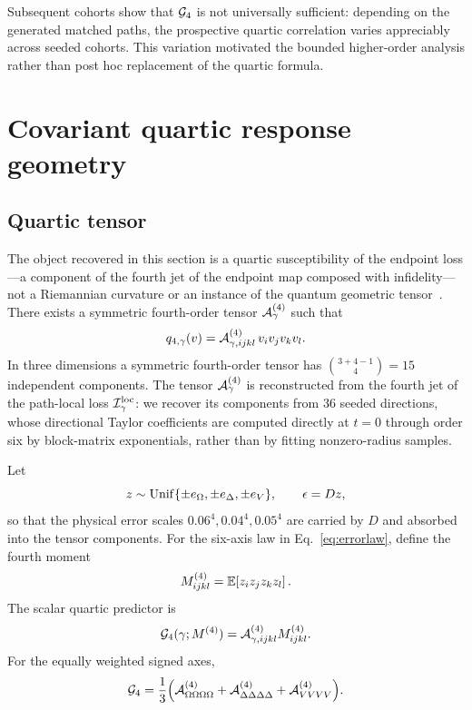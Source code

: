 Subsequent cohorts show that $\mathcal{G}_{4}$ is not universally sufficient: depending on the
generated matched paths, the prospective quartic correlation varies appreciably across
seeded cohorts. This variation motivated the bounded higher-order analysis rather than post
hoc replacement of the quartic formula.

\section{Covariant quartic response geometry}\label{sec:covariant}

\subsection{Quartic tensor}

The object recovered in this section is a quartic susceptibility of the endpoint loss---a
component of the fourth jet of the endpoint map composed with infidelity---not a
Riemannian curvature or an instance of the quantum geometric tensor~\cite{provost1980}.
There exists a symmetric fourth-order tensor $\mathcal{A}^{(4)}_{\gamma}$ such that
\begin{equation}\label{eq:quartictensor}
q_{4,\gamma}(v)=\mathcal{A}^{(4)}_{\gamma,ijkl}\,v_{i}v_{j}v_{k}v_{l}.
\end{equation}
In three dimensions a symmetric fourth-order tensor has $\binom{3+4-1}{4}=15$ independent
components. The tensor $\mathcal{A}^{(4)}_{\gamma}$ is reconstructed from the fourth jet of the
path-local loss $\mathcal{I}^{\mathrm{loc}}_{\gamma}$: we recover its components from 36 seeded directions,
whose directional Taylor coefficients are computed directly at $t=0$ through order six by
block-matrix exponentials, rather than by fitting nonzero-radius samples.

Let
\[
z\sim\mathrm{Unif}\{\pm e_{\Omega},\pm e_{\Delta},\pm e_{V}\},\qquad \epsilon=Dz,
\]
so that the physical error scales $0.06^{4},0.04^{4},0.05^{4}$ are carried by $D$ and
absorbed into the tensor components. For the six-axis law in Eq.~\eqref{eq:errorlaw},
define the fourth moment
\[
M^{(4)}_{ijkl}=\mathbb{E}\!\left[z_{i}z_{j}z_{k}z_{l}\right].
\]
The scalar quartic predictor is
\begin{equation}\label{eq:g4}
\mathcal{G}_{4}(\gamma;M^{(4)})=\mathcal{A}^{(4)}_{\gamma,ijkl}M^{(4)}_{ijkl}.
\end{equation}
For the equally weighted signed axes,
\[
\mathcal{G}_{4}=\frac{1}{3}\Bigl(\mathcal{A}^{(4)}_{\Omega\Omega\Omega\Omega}
+\mathcal{A}^{(4)}_{\Delta\Delta\Delta\Delta}+\mathcal{A}^{(4)}_{VVVV}\Bigr).
\]

